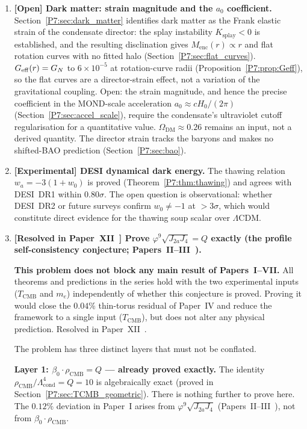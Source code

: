 \documentclass[11pt,a4paper]{article}
\theoremstyle{definition}
\theoremstyle{remark}
\newcommand{\vp}{\varphi}
\newcommand{\bz}{\beta_{0}}
\newcommand{\TCMB}{T_{\mathrm{CMB}}}
\newcommand{\rCMB}{\rho_{\mathrm{CMB}}}
\newcommand{\Lcond}{\Lambda_{\mathrm{cond}}}
\newcommand{\Ja}{J_{2a}}
\newcommand{\Jfour}{J_{4}}
\begin{document}
\begin{enumerate}[noitemsep]

\item \textbf{[Open] Dark matter: strain magnitude and the $a_0$ coefficient.}
  Section~\ref{P7:sec:dark_matter} identifies dark matter as the Frank
  elastic strain of the condensate director: the splay instability
  $K_{\mathrm{splay}}<0$ is established, and the resulting disclination
  gives $M_{\mathrm{enc}}(r)\propto r$ and flat rotation curves with no
  fitted halo (Section~\ref{P7:sec:flat_curves}).
  $G_{\rm eff}(r)=G_N$ to $6\times10^{-5}$ at rotation-curve radii
  (Proposition~\ref{P7:prop:Geff}), so the flat curves are a
  director-strain effect, not a variation of the gravitational coupling.
  Open: the strain magnitude, and hence the precise coefficient in the
  MOND-scale acceleration $a_0\approx cH_0/(2\pi)$
  (Section~\ref{P7:sec:accel_scale}), require the condensate's
  ultraviolet cutoff regularisation for a quantitative value.
  $\Omega_{\mathrm{DM}}\approx0.26$ remains an input, not a derived
  quantity.  The director strain tracks the baryons and makes no
  shifted-BAO prediction (Section~\ref{P7:sec:bao}).

\item \textbf{[Experimental] DESI dynamical dark energy.}
  The thawing relation $w_a=-3(1+w_0)$ is proved (Theorem~\ref{P7:thm:thawing})
  and agrees with DESI~DR1 within $0.80\sigma$.
  The open question is observational: whether DESI~DR2 or future surveys
  confirm $w_0\neq-1$ at $>3\sigma$, which would constitute direct evidence
  for the thawing soup scalar over $\Lambda\mathrm{CDM}$.

\item \textbf{[Resolved in Paper~XII~\cite{Paper12}] Prove $\vp^9\sqrt{\Ja\Jfour} = Q$ exactly
(the profile self-consistency conjecture; Papers~II--III~\cite{Paper2,Paper3}).}

  \textbf{This problem does not block any main result of Papers~I--VII.}
  All theorems and predictions in the series hold with the two experimental
  inputs ($\TCMB$ and $m_e$) independently of whether this conjecture is proved.
  Proving it would close the $0.04\%$ thin-torus residual of Paper~IV and
  reduce the framework to a single input ($\TCMB$), but does not alter any
  physical prediction. Resolved in Paper~XII~\cite{Paper12}.

  The problem has three distinct layers that must not be conflated.

  \textbf{Layer 1: $\bz\cdot\rCMB = Q$ --- already proved exactly.}
  The identity $\rCMB/\Lcond^4 = Q = 10$ is algebraically exact
  (proved in Section~\ref{P7:sec:TCMB_geometric}).
  There is nothing further to prove here.  The $0.12\%$ deviation
  in Paper~I arises from $\vp^9\sqrt{\Ja\Jfour}$
  (Papers~II--III~\cite{Paper2,Paper3}), not from $\bz\cdot\rCMB$.


\end{enumerate}
\end{document}

